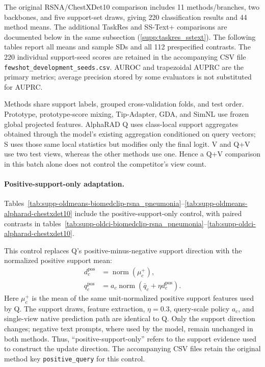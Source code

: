 The original RSNA/ChestXDet10 comparison includes 11 methods/branches, two backbones, and five support-set draws, giving 220 classification results and 44 method means. The additional TaskRes and SS-Text+ comparisons are documented below in the same subsection (\ref{supp:taskres_sstext}).
The following tables report all means and sample SDs and all 112 prespecified contrasts. The 220 individual support-seed scores are retained in the accompanying CSV file \texttt{fewshot\_development\_seeds.csv}. AUROC and trapezoidal AUPRC are the primary metrics; average precision stored by some evaluators is not substituted for AUPRC.

Methods share support labels, grouped cross-validation folds, and test order. Prototype, prototype-score mixing, Tip-Adapter, GDA, and SimNL use frozen global projected features. AlphaRAD Q uses class-local support aggregates obtained through the model's existing aggregation conditioned on query vectors; S uses those same local statistics but modifies only the final logit. V and Q+V use two test views, whereas the other methods use one. Hence a Q+V comparison in this batch alone does not control the competitor's view count.

\paragraph{Positive-support-only adaptation.}
Tables~\ref{tab:supp-oldmeans-biomedclip-rsna_pneumonia}--\ref{tab:supp-oldmeans-alpharad-chestxdet10} include the positive-support-only control, with paired contrasts in tables~\ref{tab:supp-oldci-biomedclip-rsna_pneumonia}--\ref{tab:supp-oldci-alpharad-chestxdet10}.

This control replaces Q's positive-minus-negative support direction with the normalized positive support mean:
\[
\begin{aligned}
d_c^{\mathrm{pos}}&=\operatorname{norm}(\mu_c^+),\\
q_c^{\mathrm{pos}}&=a_c\operatorname{norm}(\bar q_c+\eta d_c^{\mathrm{pos}}).
\end{aligned}
\]
Here $\mu_c^+$ is the mean of the same unit-normalized positive support features used by Q. The support draws, feature extraction, $\eta=0.3$, query-scale policy $a_c$, and single-view native prediction path are identical to Q. Only the support direction changes; negative text prompts, where used by the model, remain unchanged in both methods. Thus, ``positive-support-only'' refers to the support evidence used to construct the update direction. The accompanying CSV files retain the original method key \texttt{positive\_query} for this control.

